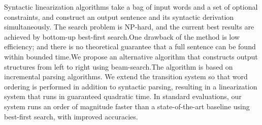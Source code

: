 Syntactic linearization algorithms take a bag of input words and a set of optional constraints, and construct an output sentence and its syntactic derivation simultaneously. The search problem is NP-hard, and the current best results are achieved by bottom-up best-first search.One drawback of the method is low efficiency; and there is no theoretical guarantee that a full sentence can be found within bounded time.We propose an alternative algorithm that constructs output structures from left to right using beam-search.The algorithm is based on incremental parsing algorithms. We extend the transition system so that word ordering is performed in addition to syntactic parsing, resulting in a linearization system that runs in guaranteed quadratic time. In standard evaluations, our system runs an order of magnitude faster than a state-of-the-art baseline using best-first search, with improved accuracies.
